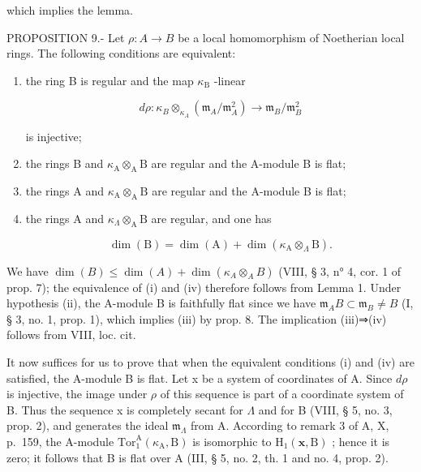 which implies the lemma.

PROPOSITION 9.- Let \(\rho : A \to B\) be a local homomorphism of Noetherian local rings. The following conditions are equivalent:

\begin{enumerate}
\def\labelenumi{(\roman{enumi})}
\tightlist
\item
  the ring B is regular and the map \(\kappa_{\mathrm{B}}\) -linear

\[
d \rho : \kappa_ {B} \otimes_ {\kappa_ {A}} \left(\mathfrak {m} _ {A} / \mathfrak {m} _ {A} ^ {2}\right) \longrightarrow \mathfrak {m} _ {B} / \mathfrak {m} _ {B} ^ {2}
\]

is injective;

\item
  the rings B and \(\kappa_{\mathrm{A}}\otimes_{\mathrm{A}}\mathrm{B}\) are regular and the A-module B is flat;
\item
  the rings A and \(\kappa_{\mathrm{A}}\otimes_{\mathrm{A}}\mathrm{B}\) are regular and the A-module B is flat;
\item
  the rings A and \(\kappa_{\Lambda} \otimes_{\mathrm{A}} \mathrm{B}\) are regular, and one has

\[
\dim (\mathrm{B}) = \dim (\mathrm{A}) + \dim (\kappa_ {\mathrm{A}} \otimes_ {\Lambda} \mathrm{B}).
\]
\end{enumerate}

We have \(\dim(B) \leqslant \dim(A) + \dim(\kappa_A \otimes_A B)\) (VIII, § 3, n° 4, cor. 1 of prop. 7); the equivalence of (i) and (iv) therefore follows from Lemma 1. Under hypothesis (ii), the A-module B is faithfully flat since we have \(\mathfrak{m}_A B \subset \mathfrak{m}_B \neq B\) (I, § 3, no. 1, prop. 1), which implies (iii) by prop. 8. The implication (iii)⇒(iv) follows from VIII, loc. cit.

It now suffices for us to prove that when the equivalent conditions (i) and (iv) are satisfied, the A-module B is flat. Let x be a system of coordinates of A. Since \(d\rho\) is injective, the image under \(\rho\) of this sequence is part of a coordinate system of B. Thus the sequence x is completely secant for \(\Lambda\) and for B (VIII, § 5, no. 3, prop. 2), and generates the ideal \(\mathfrak{m}_{\Lambda}\) from A. According to remark 3 of A, X, p.~159, the A-module \(\mathrm{Tor}_{1}^{\mathrm{A}}(\kappa_{\mathrm{A}},\mathrm{B})\) is isomorphic to \(\mathrm{H}_{1}(\mathbf{x},\mathrm{B})\) ; hence it is zero; it follows that B is flat over A (III, § 5, no. 2, th. 1 and no. 4, prop. 2).

